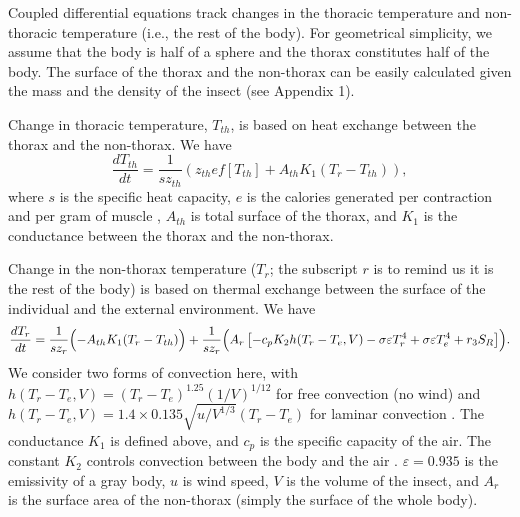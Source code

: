 Coupled differential equations  track changes in the thoracic temperature and non-thoracic temperature (i.e., the rest of the body).
For geometrical simplicity, we assume that the body is half of a sphere and the thorax constitutes half of the body.
The surface of the thorax and the non-thorax can be easily calculated given the mass and the density of the insect (see Appendix 1).

Change in thoracic temperature, $T_{th}$, is based on heat exchange between the thorax and the non-thorax.
We have 
\begin{equation} \label{eq:dTh}
	\frac{dT_{th}}{dt} = \frac{1}{s z_{th}} (z_{th} e f[T_{th}] +  A_{th} K_1(T_r - T_{th})),
\end{equation}
where $s$ is the specific heat capacity, $e$ is the calories generated per contraction and per gram of muscle \citep{Kammer1974}, $A_{th}$ is total surface of the thorax, and $K_1$ is the conductance between the thorax and the non-thorax.

Change in the  non-thorax temperature ($T_r$; the subscript $r$ is to remind us it is the rest of the body) is based on thermal exchange between the surface of the individual and the external environment.  %
We have
\begin{equation} \label{eq:dTn} 
		\frac{dT_r}{dt} =  \frac{1}{s z_{r}} \Bigl( - A_{th} K_1(T_r - T_{th})  \Bigr)
			+ \frac{1}{s z_{r}} \Bigl( A_r \left[ - c_p K_2 h(T_r -T_e, V)- \sigma \varepsilon T_r^4 + \sigma \varepsilon T_e^4  + r_3 S_R  \right] \Bigr).
\end{equation}
We consider two forms of convection here, with $ h(T_r -T_e, V) = (T_r- T_e)^{1.25} (1/V)^{1/12 }$ for free convection (no wind) and $ h(T_r -T_e, V) =  1.4 \times 0.135 \sqrt{u/V^{1/3}} (T_r- T_e) $ for laminar convection \citep{Campbell2012}.
%
The conductance $K_1$ is defined above, and $c_p$ is the specific capacity of the air.
The constant $K_2$ controls convection between the body and the air \citep{Campbell2012}.
$\varepsilon = 0.935$  is the emissivity of a gray body, $u$ is wind speed, $V$ is the volume of the insect, and $A_r$ is the surface area of the non-thorax (simply the surface of the whole body).

